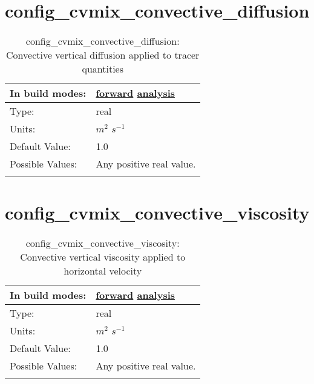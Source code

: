 \section[config\_cvmix\_convective\_diffusion]{config\_cvmix\_convective\_diffusion}
\label{sec:nm_sec_config_cvmix_convective_diffusion}
\begin{center}
\begin{longtable}{| p{2.0in} || p{4.0in} |}
    \hline
    In build modes: & \hyperref[subsec:forward_nm_tab_cvmix]{forward} \hyperref[subsec:analysis_nm_tab_cvmix]{analysis} \\
    \hline
    Type: & real \\
    \hline
    Units: & $m^2$ $s^{-1}$ \\
    \hline
    Default Value: & 1.0 \\
    \hline
    Possible Values: & Any positive real value. \\
    \hline
    \caption{config\_cvmix\_convective\_diffusion: Convective vertical diffusion applied to tracer quantities}
\end{longtable}
\end{center}
\section[config\_cvmix\_convective\_viscosity]{config\_cvmix\_convective\_viscosity}
\label{sec:nm_sec_config_cvmix_convective_viscosity}
\begin{center}
\begin{longtable}{| p{2.0in} || p{4.0in} |}
    \hline
    In build modes: & \hyperref[subsec:forward_nm_tab_cvmix]{forward} \hyperref[subsec:analysis_nm_tab_cvmix]{analysis} \\
    \hline
    Type: & real \\
    \hline
    Units: & $m^2$ $s^{-1}$ \\
    \hline
    Default Value: & 1.0 \\
    \hline
    Possible Values: & Any positive real value. \\
    \hline
    \caption{config\_cvmix\_convective\_viscosity: Convective vertical viscosity applied to horizontal velocity}
\end{longtable}
\end{center}
